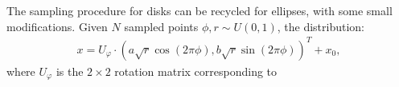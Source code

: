 \documentclass[letterpaper,11pt]{article}
\begin{document}
The sampling procedure for disks can be recycled for ellipses, with some small modifications. Given $N$ sampled points $\phi, r \sim U(0,1)$, the distribution:
%
\begin{align}
    x =  U_\varphi \cdot \left(a\sqrt{r}\cos(2\pi\phi ), b\sqrt{r}\sin(2\pi\phi)\right)^T + x_0, \label{eq:ellipse_sampler}
\end{align}
%
where $U_{\varphi}$ is the $2\times2$ rotation matrix corresponding to                                                                                                                                                                                                                                                                                                                                                                                                                                                                                                                                                                                                                                                                                                                                                                                                                                                                                                                                                                                                                                                                                                                                                                                                                                                                                                                                                                                                                                                                                                                                                                                                                                                                                                                                                                                                                                                                                                                                                                                                                                                                                                                                                                                                                                                                                                                                                                                                                                                                                                                                                                                                                                                                                                                                                                                                                                                                                                                                        
\end{document}
